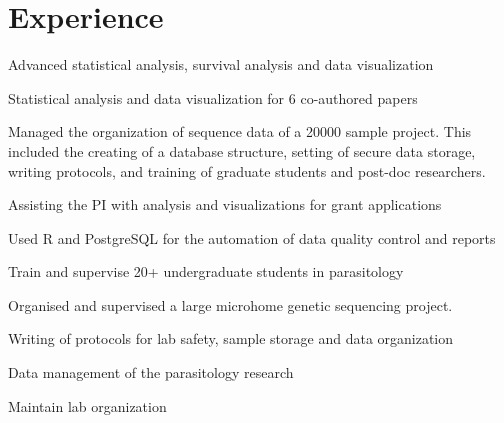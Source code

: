 \documentclass[letterpaper]{deedy-resume} %
\begin{document}
\begin{minipage}[t]{0.66\textwidth} %


\section{Experience}

\vspace{\topsep} %
\begin{tightitemize}
\item Advanced statistical analysis, survival analysis and data visualization
\item Statistical analysis and data visualization for 6 co-authored papers
\item Managed the organization of sequence data of a 20000 sample project. This included the creating of a database structure, setting of secure data storage, writing protocols, and training of graduate students and post-doc researchers.
\item Assisting the PI with analysis and visualizations for grant applications
\item Used R and PostgreSQL for the automation of data quality control and reports
\end{tightitemize}

\sectionspace %

\begin{tightitemize}
\item Train and supervise 20+ undergraduate students in parasitology
\item Organised and supervised a large microhome genetic sequencing project.
\item Writing of protocols for lab safety, sample storage and data organization
\item Data management of the parasitology research
\item Maintain lab organization
\end{tightitemize}


\end{minipage}
\end{document}

